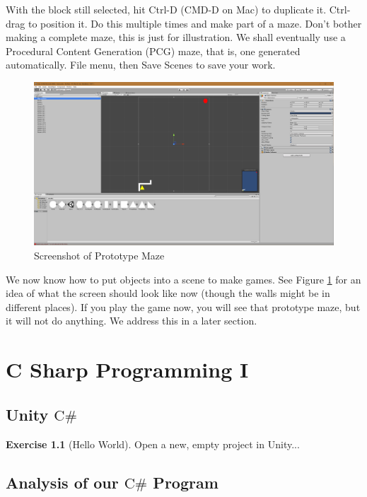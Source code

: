 \documentclass[12pt]{amsbook}
\theoremstyle{definition}
\newtheorem{exercise}{Exercise}[chapter]
\theoremstyle{remark}
\numberwithin{figure}{chapter}
\numberwithin{table}{chapter}
\numberwithin{section}{chapter}
\numberwithin{equation}{section}
\newcommand{\csharp}{\ensuremath{\mbox{C}\#}\xspace}
\begin{document}
With the block still selected, hit Ctrl-D (CMD-D on Mac) to duplicate it.  Ctrl-drag to position it.  Do this multiple times and make part of a maze.  Don't bother making a complete maze, this is just for illustration.  We shall eventually use a Procedural Content Generation (PCG) maze, that is, one generated automatically.  File menu, then Save Scenes to save your work.


\begin{figure}[h]
  \includegraphics[width=6in]{ProtoMaze.png}
  \caption{Screenshot of Prototype Maze}
  \label{fig:protomaze}
\end{figure}

We now know how to put objects into a scene to make games.  See Figure \ref{fig:protomaze} for an idea of what the screen should look like now (though the walls might be in different places).  If you play the game now, you will see that prototype maze, but it will not do anything.  We address this in a later section.

\chapter{C Sharp Programming I}


\section{Unity \csharp}


\begin{exercise}[Hello World]
Open a new, empty project in Unity...
\end{exercise}


\section{Analysis of our \csharp Program}
\end{document}
